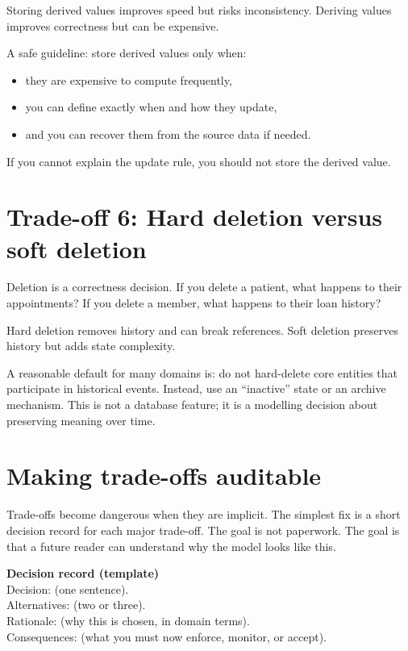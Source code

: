 Storing derived values improves speed but risks inconsistency.
Deriving values improves correctness but can be expensive.

A safe guideline:
store derived values only when:
\begin{itemize}[leftmargin=*,nosep]
  \item they are expensive to compute frequently,
  \item you can define exactly when and how they update,
  \item and you can recover them from the source data if needed.
\end{itemize}

If you cannot explain the update rule, you should not store the derived value.

\section{Trade-off 6: Hard deletion versus soft deletion}
Deletion is a correctness decision.
If you delete a patient, what happens to their appointments?
If you delete a member, what happens to their loan history?

Hard deletion removes history and can break references.
Soft deletion preserves history but adds state complexity.

A reasonable default for many domains is:
do not hard-delete core entities that participate in historical events.
Instead, use an “inactive” state or an archive mechanism.
This is not a database feature; it is a modelling decision about preserving meaning over time.

\section{Making trade-offs auditable}
Trade-offs become dangerous when they are implicit.
The simplest fix is a short decision record for each major trade-off.
The goal is not paperwork.
The goal is that a future reader can understand why the model looks like this.

\begin{examplebox}
\textbf{Decision record (template)}\\[2pt]
Decision: (one sentence).\\
Alternatives: (two or three).\\
Rationale: (why this is chosen, in domain terms).\\
Consequences: (what you must now enforce, monitor, or accept).
\end{examplebox}

